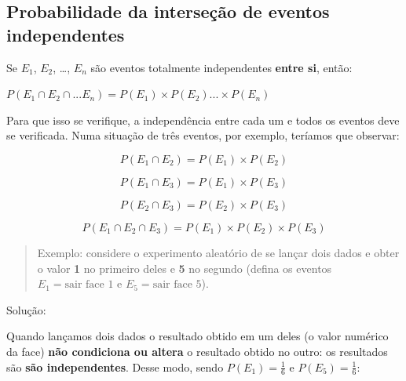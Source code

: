 \documentclass[
]{book}
\begin{document}
\hfill\break

\hypertarget{probabilidade-da-interseuxe7uxe3o-de-eventos-independentes}{%
\subsection{Probabilidade da interseção de eventos independentes}\label{probabilidade-da-interseuxe7uxe3o-de-eventos-independentes}}

Se \(E_{1}\), \(E_{2}\), \ldots, \(E_{n}\) são eventos totalmente independentes \textbf{entre si}, então:

\hfill\break

\begin{center}
$P (E_{1} \cap E_{2} \cap ... E_{n})= P(E_{1}) \times P(E_{2}) ... \times P(E_{n})$
\end{center}

\hfill\break

Para que isso se verifique, a independência entre cada um e todos os eventos deve se verificada. Numa situação de três eventos, por exemplo, teríamos que observar:

\hfill\break

\[
P (E_{1} \cap E_{2})= P(E_{1}) \times P(E_{2})
\]

\hfill\break

\[
P (E_{1} \cap E_{3})= P(E_{1}) \times P(E_{3})
\]

\hfill\break

\[
P (E_{2} \cap E_{3})= P(E_{2}) \times P(E_{3})
\]

\hfill\break

\[
P (E_{1} \cap E_{2} \cap E_{3} )= P(E_{1}) \times P(E_{2}) \times P(E_{3})
\]

\hfill\break

\begin{quote}
Exemplo: considere o experimento aleatório de se lançar dois dados e obter o valor \textbf{1} no primeiro deles e \textbf{5} no segundo (defina os eventos \(E_{1}= \text{sair face 1}\) e \(E_{5}=\text{sair face 5}\)).
\end{quote}

\hfill\break

Solução:

\hfill\break

Quando lançamos dois dados o resultado obtido em um deles (o valor numérico da face) \textbf{não condiciona ou altera} o resultado obtido no outro: os resultados são \textbf{são independentes}. Desse modo, sendo \(P(E_{1})=\frac{1}{6}\) e \(P(E_{5})=\frac{1}{6}\):
\end{document}

